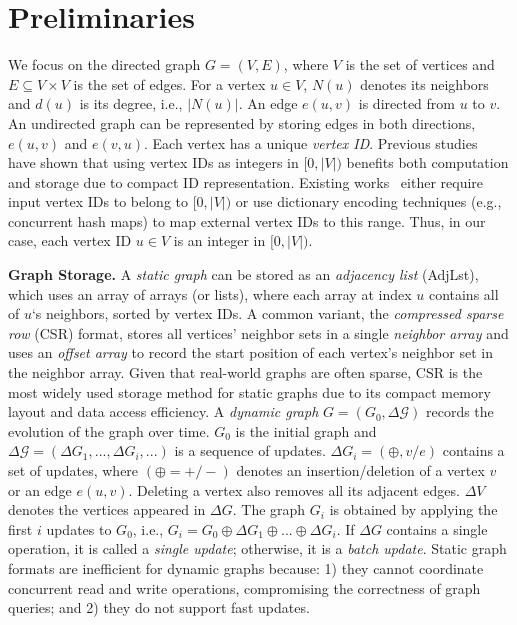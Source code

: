 
\section{Preliminaries} \label{sec:preliminaries}

We focus on the directed graph $G = (V, E)$, where $V$ is the set of vertices and $E \subseteq V \times V$ is the set of edges. For a vertex $u \in V$, $N(u)$ denotes its neighbors and $d(u)$ is its degree, i.e., $|N(u)|$. An edge $e(u, v)$ is directed from $u$ to $v$. An undirected graph can be represented by storing edges in both directions, $e(u, v)$ and $e(v, u)$. Each vertex has a unique \emph{vertex ID}. Previous studies~\cite{aberger2017emptyheaded,han2018speeding,yang2024hero,wang2017experimental,gonzalez2012powergraph} have shown that using vertex IDs as integers in $[0, |V|)$ benefits both computation and storage due to compact ID representation. Existing works~\cite{zhu2019livegraph,macko2015llama,de2021teseo,fuchs2022sortledton,dhulipala2019low} either require input vertex IDs to belong to $[0, |V|)$ or use dictionary encoding techniques (e.g., concurrent hash maps) to map external vertex IDs to this range. Thus, in our case, each vertex ID $u \in V$ is an integer in $[0, |V|)$.

\vspace{2pt}
\noindent\textbf{Graph Storage.} A \emph{static graph} can be stored as an \emph{adjacency list} (AdjLst), which uses an array of arrays (or lists), where each array at index $u$ contains all of $u$‘s neighbors, sorted by vertex IDs. A common variant, the \emph{compressed sparse row} (CSR) format, stores all vertices’ neighbor sets in a single \emph{neighbor array} and uses an \emph{offset array} to record the start position of each vertex’s neighbor set in the neighbor array. Given that real-world graphs are often sparse, CSR is the most widely used storage method for static graphs due to its compact memory layout and data access efficiency. A \emph{dynamic graph} $G = (G_0, \Delta \mathcal{G})$ records the evolution of the graph over time. $G_0$ is the initial graph and $\Delta \mathcal{G} = (\Delta G_1, ..., \Delta G_i, ...)$ is a sequence of updates. $\Delta G_i = {(\oplus, v/e)}$ contains a set of updates, where $(\oplus = +/-)$ denotes an insertion/deletion of a vertex $v$ or an edge $e(u, v)$. Deleting a vertex also removes all its adjacent edges. $\Delta V$ denotes the vertices appeared in $\Delta G$. The graph $G_i$ is obtained by applying the first $i$ updates to $G_0$, i.e., $G_i = G_0 \oplus \Delta G_1 \oplus ... \oplus \Delta G_i$. If $\Delta G$ contains a single operation, it is called a \emph{single update}; otherwise, it is a \emph{batch update}. Static graph formats are inefficient for dynamic graphs because: 1) they cannot coordinate concurrent read and write operations, compromising the correctness of graph queries; and 2) they do not support fast updates. 

